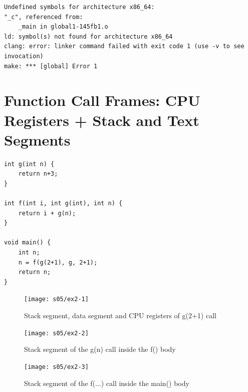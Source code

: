 \pagebreak

\begin{lstlisting}[language={},caption={Error message of gcc}]
Undefined symbols for architecture x86_64:
"_c", referenced from:
    _main in global1-145fb1.o
ld: symbol(s) not found for architecture x86_64
clang: error: linker command failed with exit code 1 (use -v to see invocation)
make: *** [global] Error 1
\end{lstlisting}




%
%
\section{Function Call Frames: CPU Registers + Stack and Text Segments}

\begin{lstlisting}
int g(int n) {
    return n+3;
}

int f(int i, int g(int), int n) {
    return i + g(n);
}

void main() {
    int n;
    n = f(g(2+1), g, 2+1);
    return n;
}
\end{lstlisting}

\pagebreak
{}

\begin{figure}[H]
    \center
    \texttt{[image: s05/ex2-1]}
    \caption{Stack segment, data segment and CPU registers of g(2+1) call\label{fig:ex2-1}}
\end{figure}



\pagebreak
{}



\begin{figure}[H]
    \center
    \texttt{[image: s05/ex2-2]}
    \caption{Stack segment of the g(n) call inside the f() body\label{fig:ex2-2}}
\end{figure}


\begin{figure}[H]
    \center
    \texttt{[image: s05/ex2-3]}
    \caption{Stack segment of the f(...) call inside the main() body\label{fig:ex2-3}}
\end{figure}

